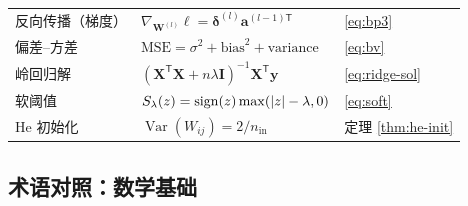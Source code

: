 \documentclass[UTF8,a4paper,11pt]{ctexart}
\theoremstyle{definition}
\theoremstyle{plain}
\theoremstyle{remark}
\DeclarePairedDelimiter{\abs}{\lvert}{\rvert}
\DeclareMathOperator{\sgn}{sign}
\DeclareMathOperator{\Var}{Var}
\newcommand{\T}{^{\mathsf{T}}}
\begin{document}
\begin{center}
\begin{tabular}{@{}p{}p{}p{}@{}}
反向传播（梯度） & $\nabla_{\bm{W}^{(l)}}\ell=\bm{\delta}^{(l)}\bm{a}^{(l-1)\mathsf{T}}$ & \eqref{eq:bp3}\\
偏差--方差 & $\text{MSE}=\sigma^2+\text{bias}^2+\text{variance}$ & \eqref{eq:bv}\\
岭回归解 & $(\bm{X}\T\bm{X}+n\lambda\bm{I})^{-1}\bm{X}\T\bm{y}$ & \eqref{eq:ridge-sol}\\
软阈值 & $S_\lambda(z)=\sgn(z)\max(\abs{z}-\lambda,0)$ & \eqref{eq:soft}\\
He 初始化 & $\Var(W_{ij})=2/n_{\text{in}}$ & 定理 \ref{thm:he-init}\\
\bottomrule
\end{tabular}
\end{center}

\subsection{术语对照：数学基础}
\end{document}
